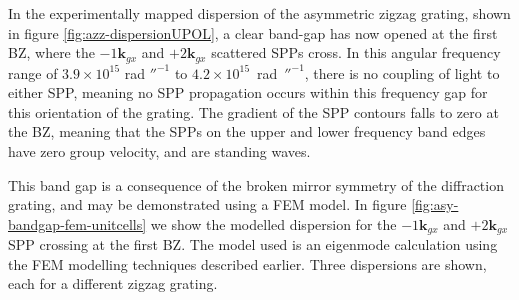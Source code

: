 In the experimentally mapped dispersion of the asymmetric zigzag grating, shown in figure \ref{fig:azz-dispersionUPOL}, a clear band-gap has now opened at the first BZ, where the $-1\mathbf{k}_{gx}$ and $+2\mathbf{k}_{gx}$ scattered SPPs cross. In this angular frequency range of $3.9\times 10^{15}$ rad $\second^{-1}$ to \mbox{$4.2\times 10^{15}$ rad $\second^{-1}$}, there is no coupling of light to either SPP, meaning no SPP propagation occurs within this frequency gap for this orientation of the grating. The gradient of the SPP contours falls to zero at the BZ, meaning that the SPPs on the upper and lower frequency band edges have zero group velocity, and are standing waves. 

This band gap is a consequence of the broken mirror symmetry of the diffraction grating, and may be demonstrated using a FEM model.  In figure \ref{fig:asy-bandgap-fem-unitcells} we show the modelled dispersion for the $-1\mathbf{k}_{gx}$ and $+2\mathbf{k}_{gx}$ SPP crossing at the first BZ. The model used is an eigenmode calculation using the FEM modelling techniques described earlier. Three dispersions are shown, each for a different zigzag grating.

